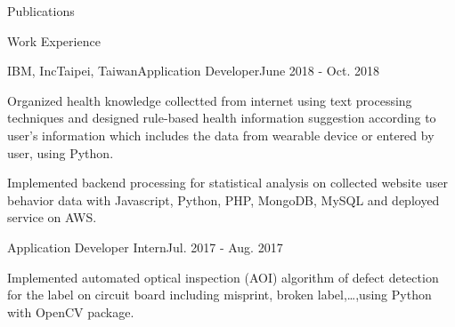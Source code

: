 \documentclass{resume} %
\begin{document}
\begin{rSection}{Publications}
    
    
    \begin{enumerate}[label={[\arabic*]}]
    \item {}
    \item {}
    \item {}
    \item {}
    \end{enumerate}    
\end{rSection}


\begin{rSection}{Work Experience}
    \begin{rSubsection}{IBM, Inc}{Taipei, Taiwan}{Application Developer}{June 2018 - Oct. 2018}
        \item Organized health knowledge collectted from internet using text processing techniques
        and designed rule-based health information suggestion according to user's information which includes the data from wearable device or entered by user, using Python.
        \item Implemented backend processing for statistical analysis on collected website user behavior data with Javascript, Python, PHP, MongoDB, MySQL and deployed service on AWS.
    \end{rSubsection}
    \begin{rSubsection2}{Application Developer Intern}{Jul. 2017 - Aug. 2017}
        \item Implemented automated optical inspection (AOI) algorithm of defect detection for the label on circuit board 
        including misprint, broken label,\dots,using Python with OpenCV package.
    \end{rSubsection2}
\end{rSection}
\end{document}
